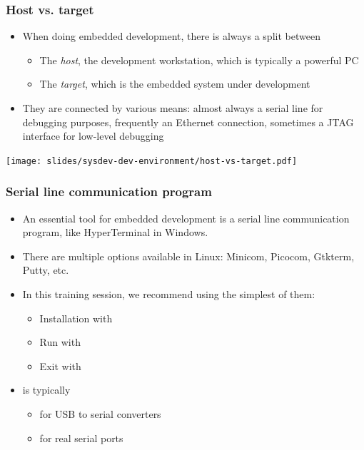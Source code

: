 \begin{frame}
  \frametitle{Host vs. target}
  \begin{itemize}
  \item When doing embedded development, there is always a split between
    \begin{itemize}
    \item The {\em host}, the development workstation, which is
      typically a powerful PC
    \item The {\em target}, which is the embedded system under
      development
    \end{itemize}
  \item They are connected by various means: almost always a serial
    line for debugging purposes, frequently an Ethernet connection,
    sometimes a JTAG interface for low-level debugging
  \end{itemize}
  \begin{center}
    \texttt{[image: slides/sysdev-dev-environment/host-vs-target.pdf]}
  \end{center}
\end{frame}

\begin{frame}
  \frametitle{Serial line communication program}
  \begin{itemize}
  \item An essential tool for embedded development is a serial line
    communication program, like HyperTerminal in Windows.
  \item There are multiple options available in Linux: Minicom,
    Picocom, Gtkterm, Putty, etc.
  \item In this training session, we recommend using the simplest of
    them: 
    \begin{itemize}
    \item Installation with 
    \item Run with 
    \item Exit with 
    \end{itemize}
  \item {} is typically
    \begin{itemize}
    \item {} for USB to serial converters
    \item {} for real serial ports
    \end{itemize}
  \end{itemize}
\end{frame}

